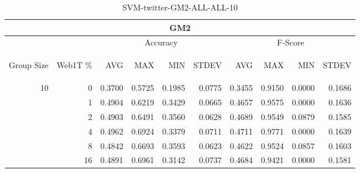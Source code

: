 \begin{center}
\begin{table}[htbp] 
 \begin{center}
\begin{tabular}{ | r | r | r | r | r | r | r | r | r | r |}
\hline
\multicolumn{10}{|c|}{GM2}\\
\hline
 & & \multicolumn{4}{|c|}{Accuracy} & \multicolumn{4}{|c|}{F-Score}\\ \cline{3-10}
\begin{sideways}Group Size\end{sideways} & \begin{sideways}Web1T \%\end{sideways} & \begin{sideways}AVG\end{sideways} & \begin{sideways}MAX\end{sideways} & \begin{sideways}MIN\end{sideways} & \begin{sideways}STDEV\end{sideways} & \begin{sideways}AVG\end{sideways} & \begin{sideways}MAX\end{sideways} & \begin{sideways}MIN\end{sideways} & \begin{sideways}STDEV\end{sideways}\\
\hline
\multirow{5}{*}{10}
 & 0 & 0.3700 & 0.5725 & 0.1985 & 0.0775 & 0.3455 & 0.9150 & 0.0000 & 0.1686\\ \cline{2-10}
 & 1 & 0.4904 & 0.6219 & 0.3429 & 0.0665 & 0.4657 & 0.9575 & 0.0000 & 0.1636\\ \cline{2-10}
 & 2 & 0.4903 & 0.6491 & 0.3560 & 0.0628 & 0.4689 & 0.9549 & 0.0879 & 0.1585\\ \cline{2-10}
 & 4 & 0.4962 & 0.6924 & 0.3379 & 0.0711 & 0.4711 & 0.9771 & 0.0000 & 0.1639\\ \cline{2-10}
 & 8 & 0.4842 & 0.6693 & 0.3593 & 0.0623 & 0.4622 & 0.9524 & 0.0857 & 0.1603\\ \cline{2-10}
 & 16 & 0.4891 & 0.6961 & 0.3142 & 0.0737 & 0.4684 & 0.9421 & 0.0000 & 0.1581\\ \cline{2-10}
\hline
\end{tabular}
\caption{SVM-twitter-GM2-ALL-ALL-10}
\label{table:SVM-twitter-GM2-ALL-ALL-10}
\end{center}
 \end{table}
\end{center}

